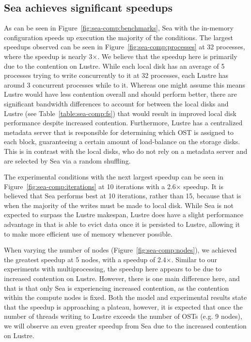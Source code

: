 \documentclass[10pt,journal,compsoc]{IEEEtran}
\begin{document}
      \subsection{Sea achieves significant speedups}

      As can be seen in Figure~\ref{fig:sea-comp:benchmarks}, Sea with the
      in-memory configuration speeds up execution the majority of the
      conditions. The largest speedups observed can be seen in
      Figure~\ref{fig:sea-comp:processes} at 32 processes, where the speedup is
      nearly 3$\times$. We believe that the speedup here is primarily due to the
      contention on Lustre. While each local disk has an average of 5 processes
      trying to write concurrently to it at 32 processes, each Lustre has around
      3 concurrent processes while to it. Whereas one might assume this means
      Lustre would have less contention overall and should perform better, there
      are significant bandwidth differences to account for between the local
      disks and Lustre (see Table~\ref{table:sea-comp:fs}) that would result in
      improved local disk performance despite increased contention. Furthermore,
      Lustre has a centralized metadata server that is responsible for
      determining which OST is assigned to each block, guaranteeing a certain
      amount of load-balance on the storage disks. This is in contrast with the
      local disks, who do not rely on a metadata server and are selected by Sea
      via a random shuffling.

      The experimental conditions with the next largest speedup can be seen in
      Figure~\ref{fig:sea-comp:iterations} at 10 iterations with a 2.6$\times$
      speedup. It is believed that Sea performs best at 10 iterations, rather
      than 15, because that is when the majority of the writes must be made to
      local disk. While Sea is not expected to surpass the Lustre makespan,
      Lustre does have a slight performance advantage in that is able to evict
      data once it is persisted to Lustre, allowing it to make more efficient
      use of memory whenever possible. 

      When varying the number of nodes (Figure~\ref{fig:sea-comp:nodes}), we
      achieved the greatest speedup at 5 nodes, with a speedup of 2.4$\times$.
      Similar to our experiments with multiprocessing, the speedup here appears
      to be due to increased contention on Lustre. However, there is one main
      difference here, and that is that only Sea is experiencing increased
      contention, as the contention within the compute nodes is fixed. Both the
      model and experimental results state that the speedup is approaching a
      plateau, however, it is expected that once the number of threads writing
      to Lustre exceeds the number of OSTs (e.g. 9 nodes), we will observe an
      even greater speedup from Sea due to the increased contention on Lustre.
\end{document}
